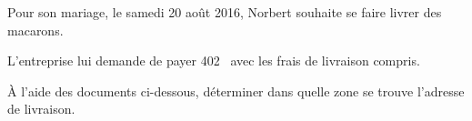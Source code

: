 \documentclass[10pt]{article}
\newcommand{\euro}{\eurologo{}}
\begin{document}
\setlength\parindent{0mm}
\pagestyle{fancy}
\thispagestyle{empty}
    
    
    




\medskip

Pour son mariage, le samedi 20 août 2016, Norbert souhaite se faire livrer des macarons.

L'entreprise lui demande de payer 402~\euro{} avec les frais de livraison compris.

À l'aide des documents ci-dessous, déterminer dans quelle zone se trouve l'adresse de livraison.
\end{document}
